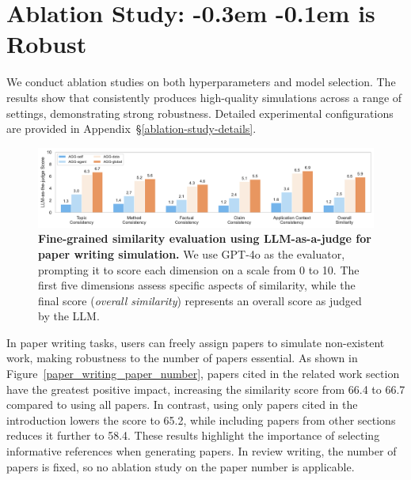 \vspace{-3mm}
\section{Ablation Study: \kern -0.3em \envname \kern -0.1em is Robust}

We conduct ablation studies on both hyperparameters and model selection. The results show that \envname consistently produces high-quality simulations across a range of settings, demonstrating strong robustness. Detailed experimental configurations are provided in Appendix~\S\ref{ablation-study-details}.



\begin{figure}[t]
    \centering
    \includegraphics[width=\linewidth]{figs/llm_prompting.pdf}
    \par\vspace{-3.5mm}
    \caption{\textbf{Fine-grained similarity evaluation using LLM-as-a-judge for paper writing simulation.} We use GPT-4o as the evaluator, prompting it to score each dimension on a scale from 0 to 10. The first five dimensions assess specific aspects of similarity, while the final score (\textit{overall similarity}) represents an overall score as judged by the LLM.}
    \label{fig:fine-grained-similarity}
    \vspace{-3mm}
\end{figure}

In paper writing tasks, users can freely assign papers to simulate non-existent work, making robustness to the number of papers essential. As shown in Figure~\ref{paper_writing_paper_number}, papers cited in the related work section have the greatest positive impact, increasing the similarity score from 66.4 to 66.7 compared to using all papers. In contrast, using only papers cited in the introduction lowers the score to 65.2, while including papers from other sections reduces it further to 58.4. These results highlight the importance of selecting informative references when generating papers. In review writing, the number of papers is fixed, so no ablation study on the paper number is applicable.

